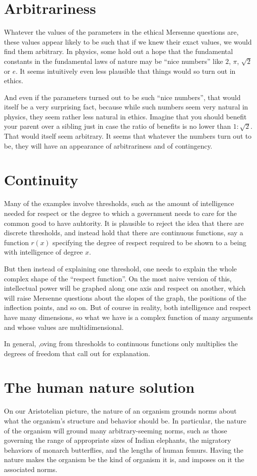 \section{Arbitrariness}
Whatever the values of the parameters in the ethical Mersenne questions are, these values appear likely to be such 
that if we knew their exact values, we would find them arbitrary.
In physics, some hold out a hope that the fundamental constants in the fundamental laws of nature may be ``nice numbers'' like
$2$, $\pi$, $\sqrt 2$ or $e$. It seems intuitively even less plausible that things would so turn out in ethics. 

And even if the parameters turned out to be such ``nice numbers'', that would itself be a very surprising fact, because while
such numbers seem very natural in physics, they seem rather less natural in ethics. Imagine that you should benefit your 
parent over a sibling just in case the ratio of benefits is no lower than $1:\sqrt{2}$. That would itself seem arbitrary.
It seems that whatever the numbers turn out to be, they will have an appearance of arbitrariness and of contingency.

\section{Continuity}
Many of the examples involve thresholds, such as the amount of intelligence needed for respect or the degree to which a government
needs to care for the common good to have auhtority. It is plausible to reject the idea that there are discrete thresholds, and instead hold 
that there are continuous functions, say a function $r(x)$ specifying the degree of respect required to be shown to a being with intelligence
of degree $x$. 

But then instead of explaining one threshold, one needs to
explain the whole complex shape of the ``respect function''. On the most naive version of this, intellectual power will be graphed along one axis
and respect on another, which will raise Mersenne questions about the slopes of the graph, the positions of the inflection points, and so on. 
But of course in reality, both intelligence and respect have many dimensions, so what we have is a complex function of many arguments and whose
values are multidimensional. 

In general, ,oving from thresholds to continuous functions only multiplies the degrees of freedom that call out for explanation.

\section{The human nature solution}
On our Aristotelian picture, the nature of an organism grounds norms about what the organism's structure and behavior 
should be. In particular, the nature of the organism will ground many arbitrary-seeming norms, such as those governing
the range of appropriate sizes of Indian elephants, the migratory behaviors of monarch butterflies, and the lengths of 
human femurs. Having the nature makes the organism be the kind of organism it is, and imposes on it the associated norms.

